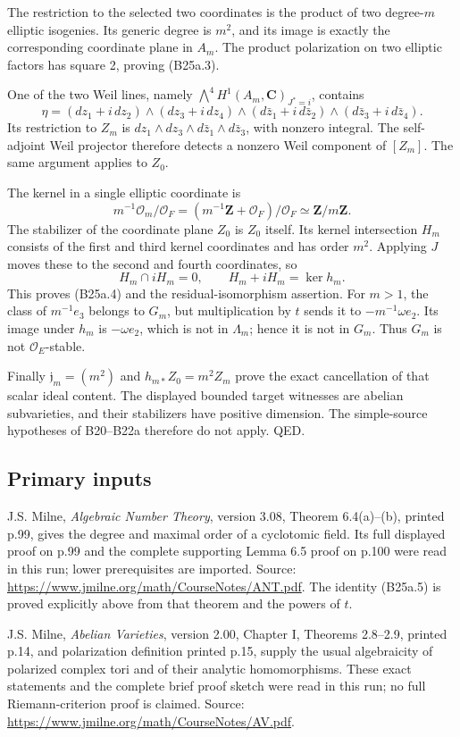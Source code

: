 The restriction to the selected two coordinates is the product of two degree-\(m\) elliptic isogenies. Its generic degree is \(m^2\), and its image is exactly the corresponding coordinate plane in \(A_m\). The product polarization on two elliptic factors has square 2, proving (B25a.3).

One of the two Weil lines, namely \(\bigwedge^4 H^1(A_m,\mathbf C)_{J^*=i}\), contains \[
 \eta=(dz_1+i\,dz_2)\wedge(dz_3+i\,dz_4)
       \wedge(d\bar z_1+i\,d\bar z_2)
       \wedge(d\bar z_3+i\,d\bar z_4).
\] Its restriction to \(Z_m\) is \(dz_1\wedge dz_3\wedge d\bar z_1\wedge d\bar z_3\), with nonzero integral. The self-adjoint Weil projector therefore detects a nonzero Weil component of \([Z_m]\). The same argument applies to \(Z_0\).

The kernel in a single elliptic coordinate is \[
 m^{-1}\mathcal O_m/\mathcal O_F
       =(m^{-1}\mathbf Z+\mathcal O_F)/\mathcal O_F\simeq\mathbf Z/m\mathbf Z.
\] The stabilizer of the coordinate plane \(Z_0\) is \(Z_0\) itself. Its kernel intersection \(H_m\) consists of the first and third kernel coordinates and has order \(m^2\). Applying \(J\) moves these to the second and fourth coordinates, so \[
 H_m\cap iH_m=0,\qquad H_m+iH_m=\ker h_m.
\] This proves (B25a.4) and the residual-isomorphism assertion. For \(m>1\), the class of \(m^{-1}e_3\) belongs to \(G_m\), but multiplication by \(t\) sends it to \(-m^{-1}\omega e_2\). Its image under \(h_m\) is \(-\omega e_2\), which is not in \(\Lambda_m\); hence it is not in \(G_m\). Thus \(G_m\) is not \(\mathcal O_E\)-stable.

Finally \(\mathfrak j_m=(m^2)\) and \(h_{m*}Z_0=m^2Z_m\) prove the exact cancellation of that scalar ideal content. The displayed bounded target witnesses are abelian subvarieties, and their stabilizers have positive dimension. The simple-source hypotheses of B20--B22a therefore do not apply. QED.

\subsection{Primary inputs}\label{primary-inputs}

J.S. Milne, \emph{Algebraic Number Theory}, version 3.08, Theorem 6.4(a)--(b), printed p.99, gives the degree and maximal order of a cyclotomic field. Its full displayed proof on p.99 and the complete supporting Lemma 6.5 proof on p.100 were read in this run; lower prerequisites are imported. Source: \url{https://www.jmilne.org/math/CourseNotes/ANT.pdf}. The identity (B25a.5) is proved explicitly above from that theorem and the powers of \(t\).

J.S. Milne, \emph{Abelian Varieties}, version 2.00, Chapter I, Theorems 2.8--2.9, printed p.14, and polarization definition printed p.15, supply the usual algebraicity of polarized complex tori and of their analytic homomorphisms. These exact statements and the complete brief proof sketch were read in this run; no full Riemann-criterion proof is claimed. Source: \url{https://www.jmilne.org/math/CourseNotes/AV.pdf}.
